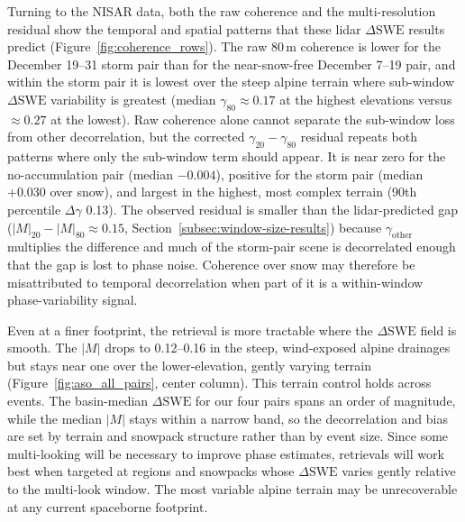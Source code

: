 \documentclass[tc, manuscript]{copernicus}
\begin{document}
Turning to the NISAR data, both the raw coherence and the multi-resolution residual show the temporal and spatial patterns that these lidar $\Delta\mathrm{SWE}$ results predict (Figure~\ref{fig:coherence_rows}). The raw 80\,\unit{m} coherence is lower for the December 19--31 storm pair than for the near-snow-free December 7--19 pair, and within the storm pair it is lowest over the steep alpine terrain where sub-window $\Delta\mathrm{SWE}$ variability is greatest (median $\gamma_{80}\approx0.17$ at the highest elevations versus $\approx0.27$ at the lowest). Raw coherence alone cannot separate the sub-window loss from other decorrelation, but the corrected $\gamma_{20}-\gamma_{80}$ residual repeats both patterns where only the sub-window term should appear. It is near zero for the no-accumulation pair (median $-0.004$), positive for the storm pair (median $+0.030$ over snow), and largest in the highest, most complex terrain (90th percentile $\Delta \gamma$ 0.13). The observed residual is smaller than the lidar-predicted gap ($|M|_{20}-|M|_{80}\approx0.15$, Section~\ref{subsec:window-size-results}) because $\gamma_\mathrm{other}$ multiplies the difference and much of the storm-pair scene is decorrelated enough that the gap is lost to phase noise. Coherence over snow may therefore be misattributed to temporal decorrelation when part of it is a within-window phase-variability signal.

Even at a finer footprint, the retrieval is more tractable where the $\Delta\mathrm{SWE}$ field is smooth. The $|M|$ drops to 0.12--0.16 in the steep, wind-exposed alpine drainages but stays near one over the lower-elevation, gently varying terrain (Figure~\ref{fig:aso_all_pairs}, center column). This terrain control holds across events. The basin-median $\Delta\mathrm{SWE}$ for our four pairs spans an order of magnitude, while the median $|M|$ stays within a narrow band, so the decorrelation and bias are set by terrain and snowpack structure rather than by event size. Since some multi-looking will be necessary to improve phase estimates, retrievals will work best when targeted at regions and snowpacks whose $\Delta\mathrm{SWE}$ varies gently relative to the multi-look window. The most variable alpine terrain may be unrecoverable at any current spaceborne footprint.
\end{document}
